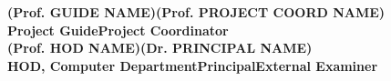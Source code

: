\begin{spacing}{0}
\vspace{3.0cm}
\large{\textbf{(Prof. GUIDE NAME)}}\hspace*{1.2in}\large{\textbf{(Prof. PROJECT COORD NAME)}}\\
\hspace*{0.7in}\textbf{Project Guide}\hspace*{2.3in}\textbf{Project Coordinator}\\[3cm]
\hspace*{0.5cm}\large{\textbf{(Prof. HOD NAME)}}\hspace*{0.8in}\large{\textbf{(Dr. PRINCIPAL NAME)}}\\
\textbf{HOD, Computer Department}\hspace*{0.8in}\textbf{Principal}\hspace*{1.1in}\textbf{External Examiner}
\end{spacing}